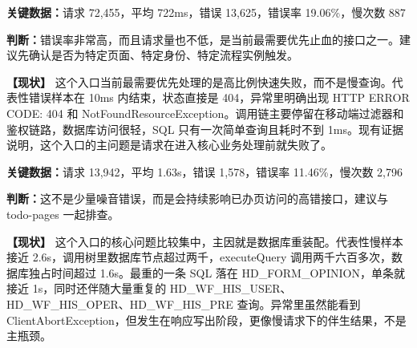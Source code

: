 \noindent\textbf{关键数据：}请求 72,455，平均 722ms，错误 13,625，错误率 19.06\%，慢次数 887\par

\noindent\textbf{判断：}错误率非常高，而且请求量也不低，是当前最需要优先止血的接口之一。建议先确认是否为特定页面、特定身份、特定流程实例触发。\par

\vspace{0.25em}

\noindent\textbf{【现状】} 这个入口当前最需要优先处理的是高比例快速失败，而不是慢查询。代表性错误样本在 10ms 内结束，状态直接是 404，异常里明确出现 HTTP ERROR CODE: 404 和 NotFoundResourceException。调用链主要停留在移动端过滤器和鉴权链路，数据库访问很轻，SQL 只有一次简单查询且耗时不到 1ms。现有证据说明，这个入口的主问题是请求在进入核心业务处理前就失败了。\par

\vspace{0.35em}\par

\noindent\textbf{关键数据：}请求 13,942，平均 1.63s，错误 1,578，错误率 11.46\%，慢次数 2,796\par

\noindent\textbf{判断：}这不是少量噪音错误，而是会持续影响已办页访问的高错接口，建议与 todo-pages 一起排查。\par

\vspace{0.25em}

\noindent\textbf{【现状】} 这个入口的核心问题比较集中，主因就是数据库重装配。代表性慢样本接近 2.6s，调用树里数据库节点超过两千，executeQuery 调用两千六百多次，数据库独占时间超过 1.6s。最重的一条 SQL 落在 HD\_FORM\_OPINION，单条就接近 1s，同时还伴随大量重复的 HD\_WF\_HIS\_USER、HD\_WF\_HIS\_OPER、HD\_WF\_HIS\_PRE 查询。异常里虽然能看到 ClientAbortException，但发生在响应写出阶段，更像慢请求下的伴生结果，不是主瓶颈。\par

